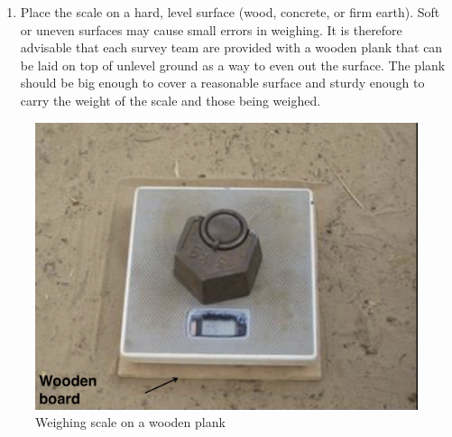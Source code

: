 \documentclass[12pt,]{book}
\providecommand{\tightlist}{%
  \setlength{\itemsep}{0pt}\setlength{\parskip}{0pt}}
\theoremstyle{definition}
\theoremstyle{definition}
\theoremstyle{definition}
\theoremstyle{remark}
\begin{document}
\begin{enumerate}
\def\labelenumi{\arabic{enumi}.}
\tightlist
\item
  Place the scale on a hard, level surface (wood, concrete, or firm
  earth). Soft or uneven surfaces may cause small errors in weighing. It
  is therefore advisable that each survey team are provided with a
  wooden plank that can be laid on top of unlevel ground as a way to
  even out the surface. The plank should be big enough to cover a
  reasonable surface and sturdy enough to carry the weight of the scale
  and those being weighed.
\end{enumerate}

\begin{figure}

{\centering \includegraphics[width=0.5\linewidth]{images/weight01} 

}

\caption{Weighing scale on a wooden plank}\label{fig:weight5}
\end{figure}
\end{document}
